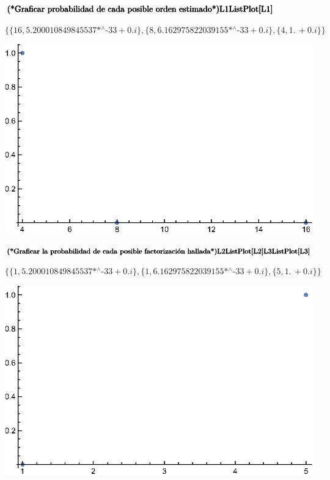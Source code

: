 \begin{doublespace}
\noindent\(\pmb{\text{(*Graficar probabilidad de cada posible orden estimado*)}}\\
\pmb{\text{L1}}\\
\pmb{\text{ListPlot}[\text{L1}]}\)
\end{doublespace}

\begin{doublespace}
\noindent\(\{\{16,\text{5.200010849845537$\grave{ }$*${}^{\wedge}$-33}+0. i\},\{8,\text{6.162975822039155$\grave{ }$*${}^{\wedge}$-33}+0. i\},\{4,1.\,
+0. i\}\}\)
\end{doublespace}

\includegraphics{img/Shor_gr2.eps}

\begin{doublespace}
\noindent\(\pmb{\text{(*Graficar la probabilidad de cada posible factorizaci{\' o}n hallada*)}}\\
\pmb{\text{L2}}\\
\pmb{\text{ListPlot}[\text{L2}]}\\
\pmb{\text{L3}}\\
\pmb{\text{ListPlot}[\text{L3}]}\)
\end{doublespace}

\begin{doublespace}
\noindent\(\{\{1,\text{5.200010849845537$\grave{ }$*${}^{\wedge}$-33}+0. i\},\{1,\text{6.162975822039155$\grave{ }$*${}^{\wedge}$-33}+0. i\},\{5,1.\,
+0. i\}\}\)
\end{doublespace}

\includegraphics{img/Shor_gr3.eps}

